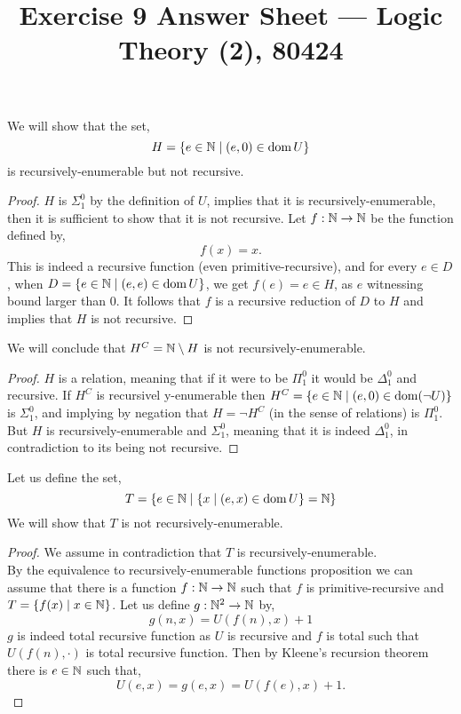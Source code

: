 
\title{Exercise 9 Answer Sheet --- Logic Theory (2), 80424}

\DeclareMathOperator{\PA}{PA}
\DeclareMathOperator{\Coll}{Coll}
\DeclareMathOperator{\Ind}{Ind}
\DeclareMathOperator{\Sat}{Sat}


\maketitle
\maketitleprint[yellow]

\question{}
\subquestion{}
We will show that the set,
\[
	H
	= \{ e \in \mathbb{N} \mid (e, 0) \in \operatorname{dom} U \}
\]
is recursively-enumerable but not recursive.
\begin{proof}
	$H$ is $\Sigma_1^0$ by the definition of $U$, implies that it is recursively-enumerable, then it is sufficient to show that it is not recursive.
	Let $f : \mathbb{N} \to \mathbb{N}$ be the function defined by,
	\[
		f(x) = x
	.\]
	This is indeed a recursive function (even primitive-recursive), and for every $e \in D$, when $D = \{ e \in \mathbb{N} \mid (e, e) \in \operatorname{dom} U \}$, we get $f(e) = e \in H$, as $e$ witnessing bound larger than $0$.
	It follows that $f$ is a recursive reduction of $D$ to $H$ and implies that $H$ is not recursive.
\end{proof}

\subquestion{}
We will conclude that $H^C = \mathbb{N} \setminus H$ is not recursively-enumerable.
\begin{proof}
	$H$ is a relation, meaning that if it were to be $\Pi_1^0$ it would be $\Delta_1^0$ and recursive.
	If $H^C$ is recursivel y-enumerable then $H^C = \{ e \in \mathbb{N} \mid (e, 0) \in \operatorname{dom}(\lnot U) \}$ is $\Sigma_1^0$, and implying by negation that $H = \lnot H^C$ (in the sense of relations) is $\Pi_1^0$.
	But $H$ is recursively-enumerable and $\Sigma_1^0$, meaning that it is indeed $\Delta_1^0$, in contradiction to its being not recursive.
\end{proof}

\subquestion{}
Let us define the set,
\[
	T = \{ e \in \mathbb{N} \mid \{ x \mid (e, x) \in \operatorname{dom} U \} = \mathbb{N} \}
\]
We will show that $T$ is not recursively-enumerable.
\begin{proof}
	We assume in contradiction that $T$ is recursively-enumerable. \\
	By the equivalence to recursively-enumerable functions proposition we can assume that there is a function $f : \mathbb{N} \to \mathbb{N}$ such that $f$ is primitive-recursive and $T = \{ f(x) \mid x \in \mathbb{N} \}$.
	Let us define $g : \mathbb{N}^2 \to \mathbb{N}$ by,
	\[
		g(n, x) = U(f(n), x) + 1
	\]
	$g$ is indeed total recursive function as $U$ is recursive and $f$ is total such that $U(f(n), \cdot)$ is total recursive function.
	Then by Kleene's recursion theorem there is $e \in \mathbb{N}$ such that,
	\[
		U(e, x)
		= g(e, x)
		= U(f(e), x) + 1
	.\]
\end{proof}


